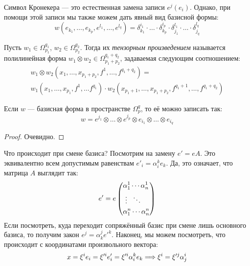 \begin{note}
	Символ Кронекера --- это естественная замена записи $e^j(e_i)$. Однако, при помощи этой записи мы также можем дать явный вид базисной формы:
	\[
		w(e_{k_1}, \ldots, e_{k_p}, e^{l_1}, \ldots, e^{l_q}) = \delta_{k_1}^{i_1} \cdot \ldots \cdot \delta_{k_p}^{i_p} \cdot \delta_{j_1}^{l_1} \cdot \ldots \cdot \delta_{j_q}^{l_q}
	\]
\end{note}

\begin{definition}
	Пусть $w_1 \in \Omega_{p_1}^{q_1}$, $w_2 \in \Omega_{p_2}^{q_2}$. Тогда их \textit{тензорным произведением} называется полилинейная форма $w_1 \otimes w_2 \in \Omega_{p_1 + p_2}^{q_1 + q_2}$, задаваемая следующим соотношением:
	\begin{multline*}
		w_1 \otimes w_2(x_1, \ldots, x_{p_1 + p_2}, f^1, \ldots, f^{q_1 + q_2}) =
		\\
		w_1(x_1, \ldots, x_{p_1}, f^1, \ldots f^{q_1}) \cdot w_2(x_{p_1 + 1}, \ldots, x_{p_1 + p_2}, f^{q_1 + 1}, \ldots, f^{q_1 + q_2})
	\end{multline*}
\end{definition}

\begin{proposition}
	Если $w$ --- базисная форма в пространстве $\Omega_p^q$, то её можно записать так:
	\[
		w = e^{j_1} \otimes \ldots \otimes e^{j_p} \otimes e_{i_1} \otimes \ldots \otimes e_{i_q}
	\]
\end{proposition}

\begin{proof}
	Очевидно.
\end{proof}

\begin{note}
	Что происходит при смене базиса? Посмотрим на замену $e' = eA$. Это эквивалентно всем допустимым равенствам $e'_i = \alpha_i^k e_k$. Да, это означает, что матрица $A$ выглядит так:
	\[
		e' = e\left(\begin{aligned}
			&{\alpha_1^1 \cdots \alpha_n^1}
			\\
			&{\ \vdots\ \ \ddots}
			\\
			&{\alpha_1^n \cdots \alpha_n^n}
		\end{aligned}\right)
	\]
	Если посмотреть, куда переходит сопряжённый базис при смене лишь основного базиса, то получим закон $e^j = \alpha_k^j e'^k$. Наконец, мы можем посмотреть, что происходит с координатами произвольного вектора:
	\[
		x = \xi^i e_i = \xi'^i e'_i = \xi'^i \alpha_i^k e_k \Longrightarrow \xi^i = \xi'^j\alpha_j^i
	\]
\end{note}

